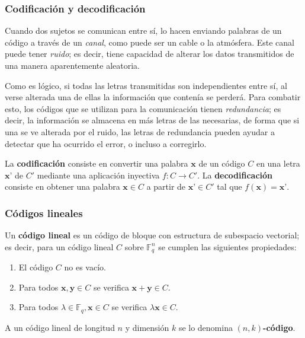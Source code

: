 \subsubsection{Codificación y decodificación}

Cuando dos sujetos se comunican entre sí, lo hacen enviando palabras de un código a través de un \textit{canal}, como puede ser un cable o la atmósfera. Este canal puede tener \textit{ruido}; es decir, tiene capacidad de alterar los datos transmitidos de una manera aparentemente aleatoria.

Como es lógico, si todas las letras transmitidas son independientes entre sí, al verse alterada una de ellas la información que contenía se perderá. Para combatir esto, los códigos que se utilizan para la comunicación tienen \textit{redundancia}; es decir, la información se almacena en más letras de las necesarias, de forma que si una se ve alterada por el ruido, las letras de redundancia pueden ayudar a detectar que ha ocurrido el error, o incluso a corregirlo.

\begin{definition}
	La \textbf{codificación} consiste en convertir una palabra $\textbf{x}$ de un código $C$ en una letra $\textbf{x'}$ de $C'$ mediante una aplicación inyectiva $f : C \rightarrow C'$. La \textbf{decodificación} consiste en obtener una palabra $\textbf{x} \in C$ a partir de $\textbf{x'} \in C'$ tal que $f(\textbf{x}) = \textbf{x'}$.
\end{definition}

\subsubsection{Códigos lineales}

\begin{definition}
	Un \textbf{código lineal} es un código de bloque con estructura de subespacio vectorial; es decir, para un código lineal $C$ sobre $\mathbb{F}_q^n$ se cumplen las siguientes propiedades:
	\begin{enumerate}
		\item El código $C$ no es vacío.
		\item Para todos $\textbf{x}, \textbf{y} \in C$ se verifica $\textbf{x} + \textbf{y} \in C$.
		\item Para todos $\lambda \in \mathbb{F}_q, \textbf{x} \in C$ se verifica $\lambda\textbf{x} \in C$.
	\end{enumerate}

	A un código lineal de longitud $n$ y dimensión $k$ se lo denomina \textbf{$(n, k)$-código}.
\end{definition}

